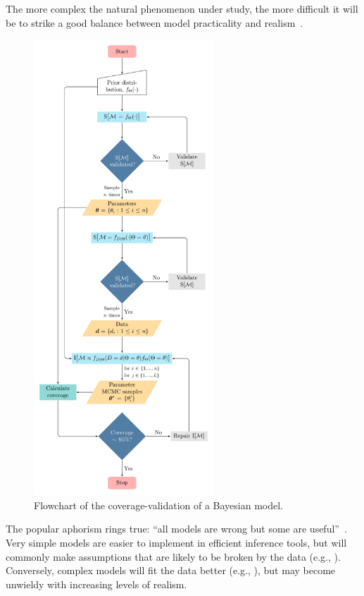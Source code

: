 \documentclass[oneside]{article}
\begin{document}
The more complex the natural phenomenon under study, the more difficult it will be to strike a good balance between model practicality and realism~\citep{levins1966}.
\begin{figure}
  \includegraphics[width=6.75cm]{../figures/flowchart.pdf}
  \caption{Flowchart of the coverage-validation of a Bayesian model.}
    \label{fig:flowchart}
\end{figure}
The popular aphorism rings true: ``all models are wrong but some are useful''~\citep{box79}.
Very simple models are easier to implement in efficient inference tools, but will commonly make assumptions that are likely to be broken by the data (e.g., \citealp{sullivan97,mendes17,mendes19}). 
Conversely, complex models will fit the data better (e.g., \citealp{ogilvie22}), but may become unwieldy with increasing levels of realism.
\end{document}
